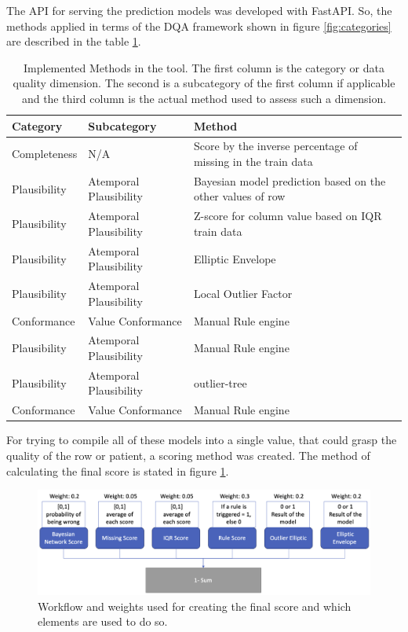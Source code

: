 The API for serving the prediction models was developed with FastAPI. So, the methods applied in terms of the DQA framework shown in figure \ref{fig:categories} are described in the table \ref{tab:methods}.

\begin{table}[htpb]
\caption{Implemented Methods in the tool. The first column is the category or data quality dimension. The second is a subcategory of the first column if applicable and the third column is the actual method used to assess such a dimension.} \label{tab:methods}
\renewcommand{\arraystretch}{1.4}
\setlength{\tabcolsep}{10pt}

\begin{tabularx}{\textwidth}{ p{2cm} p{3.5cm} X }
\hline
 Category   & Subcategory           & Method   \\ \hline
Completeness     & N/A               & Score by the inverse percentage of missing in the train data         \\ 
Plausibility & Atemporal Plausibility & Bayesian model prediction based on the other values of row \\ 
Plausibility & Atemporal Plausibility         & Z-score for column value based on IQR train data       \\    
Plausibility & Atemporal Plausibility           & Elliptic Envelope                       \\ 
Plausibility & Atemporal Plausibility           & Local Outlier Factor                \\ 
Conformance & Value Conformance           & Manual Rule engine                           \\ 
Plausibility & Atemporal Plausibility           & Manual Rule engine                      \\ 
Plausibility & Atemporal Plausibility           & outlier-tree                      \\ 
Conformance & Value Conformance & Manual Rule engine\\
\hline
\end{tabularx}

\end{table}


For trying to compile all of these models into a single value, that could grasp the quality of the row or patient, a scoring method was created. The method of calculating the final score is stated in figure \ref{fig:scoring_method}. 
\begin{figure}[htbp]
    \centering
    \caption{Workflow and weights used for creating the final score and which elements are used to do so.}\label{fig:scoring_method} 
    \includegraphics[scale=0.29]{figures/score-method.png}
    \end{figure}


